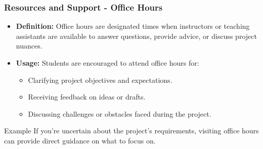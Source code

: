 \documentclass[aspectratio=169]{beamer}
\begin{document}
\begin{frame}[fragile]
    \frametitle{Resources and Support - Office Hours}
    \begin{itemize}
        \item \textbf{Definition:} Office hours are designated times when instructors or teaching assistants are available to answer questions, provide advice, or discuss project nuances.
        \item \textbf{Usage:} Students are encouraged to attend office hours for:
            \begin{itemize}
                \item Clarifying project objectives and expectations.
                \item Receiving feedback on ideas or drafts.
                \item Discussing challenges or obstacles faced during the project.
            \end{itemize}
    \end{itemize}
    \begin{block}{Example}
        If you're uncertain about the project's requirements, visiting office hours can provide direct guidance on what to focus on.
    \end{block}
\end{frame}
\end{document}
